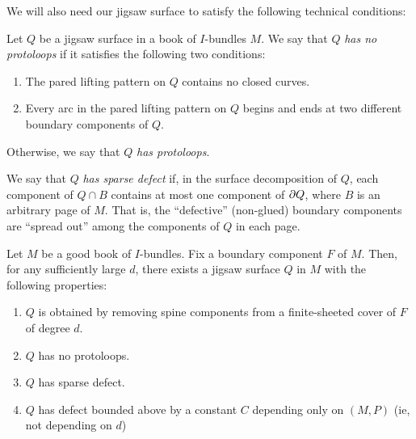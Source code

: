 We will also need our jigsaw surface to satisfy the following
technical conditions:

\begin{defn}

Let $Q$ be a jigsaw surface in a book of $I$-bundles $M$. We say that $Q$
\emph{has no protoloops} if it satisfies the following two conditions:

\begin{enumerate}

\item The pared lifting pattern on $Q$ contains no closed curves.

\item Every arc in the pared lifting pattern on $Q$ begins and ends at two
different boundary components of $Q$.

\end{enumerate}

Otherwise, we say that $Q$ \emph{has protoloops}.

\end{defn}

\begin{defn}

We say that $Q$ \emph{has sparse defect} if, in the surface decomposition of
$Q$, each component of $Q \cap B$ contains at most one component of $\partial Q$,
where $B$ is an arbitrary page of $M$.  That is, the ``defective'' (non-glued)
boundary components are ``spread out'' among the components of $Q$ in each
page.

\end{defn}

\begin{lemma}\label{L:jigsaw}

Let $M$ be a good book of $I$-bundles. Fix a boundary component $F$ of $M$.
Then, for any sufficiently large $d$, there exists a jigsaw
surface $Q$ in $M$ with the following properties:

\begin{enumerate}

\item $Q$ is obtained by removing spine components from a finite-sheeted cover
of $F$ of degree $d$.

\item $Q$ has no protoloops.

\item $Q$ has sparse defect.

\item $Q$ has defect bounded above by a constant $C$ depending only on $(M,P)$
(ie, not depending on $d$)

\end{enumerate}

\end{lemma}

